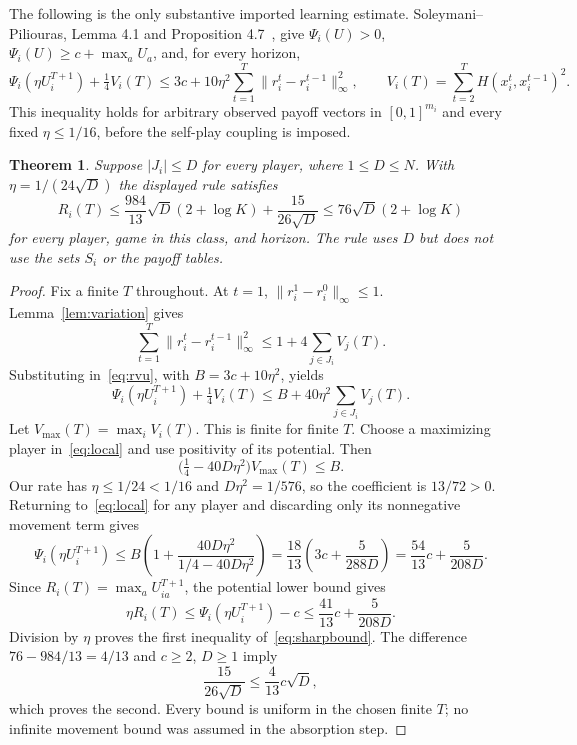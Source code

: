 \documentclass[11pt]{article}
\newtheorem{theorem}{Theorem}
\begin{document}
The following is the only substantive imported learning estimate.
Soleymani--Piliouras, Lemma 4.1 and Proposition 4.7~\cite{morm}, give
$\Psi_i(U)>0$, $\Psi_i(U)\geq c+\max_aU_a$, and, for every horizon,
\begin{equation}\label{eq:rvu}
 \Psi_i(\eta U_i^{T+1})+\tfrac14 V_i(T)
 \leq 3c+10\eta^2\sum_{t=1}^T\|r_i^t-r_i^{t-1}\|_\infty^2,
 \qquad V_i(T)=\sum_{t=2}^TH(x_i^t,x_i^{t-1})^2.
\end{equation}
This inequality holds for arbitrary observed payoff vectors in $[0,1]^{m_i}$
and every fixed $\eta\leq1/16$, before the self-play coupling is imposed.

\begin{theorem}\label{thm:upper}
Suppose $|J_i|\leq D$ for every player, where $1\leq D\leq N$.
With $\eta=1/(24\sqrt D)$ the displayed rule satisfies
\begin{equation}\label{eq:sharpbound}
 R_i(T)\leq\frac{984}{13}\sqrt D(2+\log K)
             +\frac{15}{26\sqrt D}
 \leq76\sqrt D(2+\log K)
\end{equation}
for every player, game in this class, and horizon.
The rule uses $D$ but does not use the sets $S_i$ or the payoff tables.
\end{theorem}
\begin{proof}
Fix a finite $T$ throughout. At $t=1$, $\|r_i^1-r_i^0\|_\infty\leq1$.
Lemma~\ref{lem:variation} gives
\[
 \sum_{t=1}^T\|r_i^t-r_i^{t-1}\|_\infty^2
 \leq1+4\sum_{j\in J_i}V_j(T).
\]
Substituting in~\eqref{eq:rvu}, with $B=3c+10\eta^2$, yields
\begin{equation}\label{eq:local}
 \Psi_i(\eta U_i^{T+1})+\tfrac14 V_i(T)
 \leq B+40\eta^2\sum_{j\in J_i}V_j(T).
\end{equation}
Let $V_{\max}(T)=\max_iV_i(T)$. This is finite for finite $T$.
Choose a maximizing player in~\eqref{eq:local} and use positivity of
its potential. Then
\[
 \bigl(\tfrac14-40D\eta^2\bigr)V_{\max}(T)\leq B.
\]
Our rate has $\eta\leq1/24<1/16$ and $D\eta^2=1/576$, so the
coefficient is $13/72>0$. Returning to~\eqref{eq:local} for any player
and discarding only its nonnegative movement term gives
\[
 \Psi_i(\eta U_i^{T+1})
 \leq B\left(1+\frac{40D\eta^2}{1/4-40D\eta^2}\right)
 =\frac{18}{13}\left(3c+\frac{5}{288D}\right)
 =\frac{54}{13}c+\frac5{208D}.
\]
Since $R_i(T)=\max_aU_{ia}^{T+1}$, the potential lower bound gives
\[
 \eta R_i(T)\leq\Psi_i(\eta U_i^{T+1})-c
 \leq\frac{41}{13}c+\frac5{208D}.
\]
Division by $\eta$ proves the first inequality of~\eqref{eq:sharpbound}.
The difference $76-984/13=4/13$ and $c\geq2$, $D\geq1$ imply
\[
 \frac{15}{26\sqrt D}\leq\frac4{13}c\sqrt D,
\]
which proves the second. Every bound is uniform in the chosen finite
$T$; no infinite movement bound was assumed in the absorption step.
\end{proof}
\end{document}
